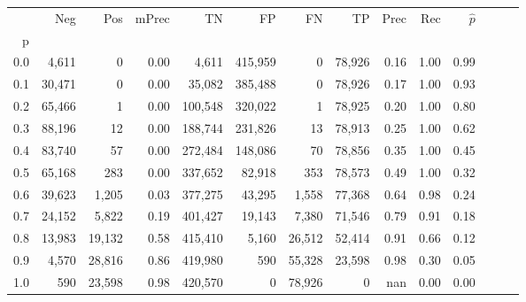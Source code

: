 \begin{tabular}{rrrrrrrrrrrrrr}
\toprule
{} &     Neg &     Pos & mPrec &       TN &       FP &      FN &      TP &  Prec &   Rec & $\hat{p}$ \\
p   &         &         &       &          &          &         &         &       &       &           \\
\midrule
0.0 &   4,611 &       0 &  0.00 &    4,611 &  415,959 &       0 &  78,926 &  0.16 &  1.00 &      0.99 \\
0.1 &  30,471 &       0 &  0.00 &   35,082 &  385,488 &       0 &  78,926 &  0.17 &  1.00 &      0.93 \\
0.2 &  65,466 &       1 &  0.00 &  100,548 &  320,022 &       1 &  78,925 &  0.20 &  1.00 &      0.80 \\
0.3 &  88,196 &      12 &  0.00 &  188,744 &  231,826 &      13 &  78,913 &  0.25 &  1.00 &      0.62 \\
0.4 &  83,740 &      57 &  0.00 &  272,484 &  148,086 &      70 &  78,856 &  0.35 &  1.00 &      0.45 \\
0.5 &  65,168 &     283 &  0.00 &  337,652 &   82,918 &     353 &  78,573 &  0.49 &  1.00 &      0.32 \\
0.6 &  39,623 &   1,205 &  0.03 &  377,275 &   43,295 &   1,558 &  77,368 &  0.64 &  0.98 &      0.24 \\
0.7 &  24,152 &   5,822 &  0.19 &  401,427 &   19,143 &   7,380 &  71,546 &  0.79 &  0.91 &      0.18 \\
0.8 &  13,983 &  19,132 &  0.58 &  415,410 &    5,160 &  26,512 &  52,414 &  0.91 &  0.66 &      0.12 \\
0.9 &   4,570 &  28,816 &  0.86 &  419,980 &      590 &  55,328 &  23,598 &  0.98 &  0.30 &      0.05 \\
1.0 &     590 &  23,598 &  0.98 &  420,570 &        0 &  78,926 &       0 &   nan &  0.00 &      0.00 \\
\bottomrule
\end{tabular}
